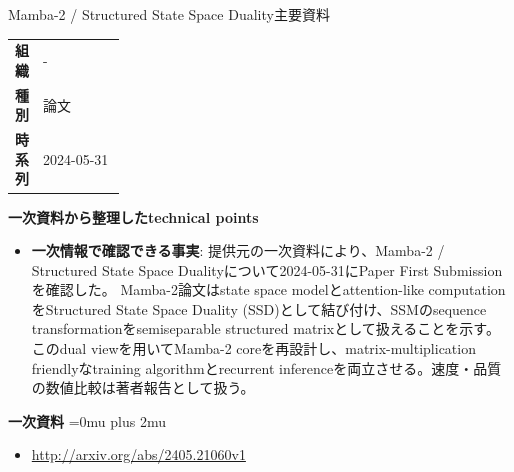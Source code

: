 \Needspace{0.38\textheight}
\begin{technicalnote}{Mamba-2 / Structured State Space Duality}{主要資料}
\begingroup
\begin{tabularx}{\linewidth}{@{}>{\bfseries}p{0.22\linewidth}X@{}}
組織 & - \\
種別 & 論文 \\
時系列 & 2024-05-31 \\
\end{tabularx}
\smallskip
\begin{minipage}{\linewidth}
{\bfseries 一次資料から整理したtechnical points}
\begin{itemize}[leftmargin=1.5em,itemsep=0.35em]
\item \textbf{一次情報で確認できる事実}: 提供元の一次資料により、Mamba-2 / Structured State Space Dualityについて2024-05-31にPaper First Submissionを確認した。 Mamba-2論文はstate space modelとattention-like computationをStructured State Space Duality (SSD)として結び付け、SSMのsequence transformationをsemiseparable structured matrixとして扱えることを示す。このdual viewを用いてMamba-2 coreを再設計し、matrix-multiplication friendlyなtraining algorithmとrecurrent inferenceを両立させる。速度・品質の数値比較は著者報告として扱う。
\end{itemize}
\begin{minipage}{\linewidth}
\begin{samepage}
{\bfseries 一次資料}
\begingroup\sloppy
\Urlmuskip=0mu plus 2mu\relax
\begin{itemize}[leftmargin=1.5em,itemsep=0.25em]
\item {\scriptsize\url{http://arxiv.org/abs/2405.21060v1}}
\end{itemize}
\endgroup
\end{samepage}
\end{minipage}
\end{minipage}
\endgroup
\end{technicalnote}
\medskip

